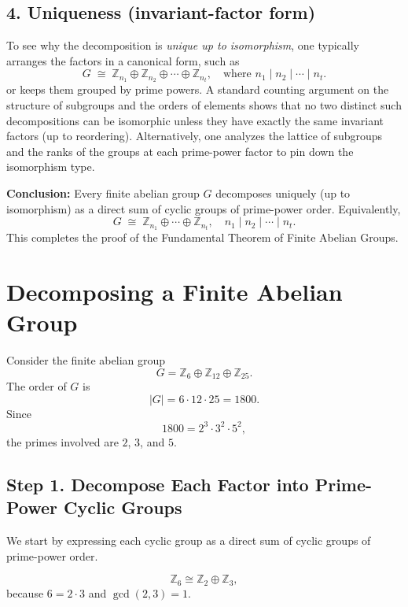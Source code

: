 \documentclass[12pt]{article}
\theoremstyle{definition} %
\theoremstyle{plain} %
\begin{document}
    \subsection*{4. Uniqueness (invariant-factor form)}
    
    To see why the decomposition is \emph{unique up to isomorphism}, one typically arranges the factors in a canonical form, such as
    \[
      G \;\cong\; \mathbb{Z}_{n_1} \oplus \mathbb{Z}_{n_2} \oplus \cdots \oplus \mathbb{Z}_{n_t},
      \quad\text{where } n_1 \mid n_2 \mid \cdots \mid n_t.
    \]
    or keeps them grouped by prime powers.  
    A standard counting argument on the structure of subgroups and the orders of elements shows that no two distinct such decompositions can be isomorphic unless they have exactly the same invariant factors (up to reordering).  
    Alternatively, one analyzes the lattice of subgroups and the ranks of the groups at each prime-power factor to pin down the isomorphism type.
    
    \bigskip
    
    \noindent
    \textbf{Conclusion:}  
    Every finite abelian group $G$ decomposes uniquely (up to isomorphism) as a direct sum of cyclic groups of prime-power order.  
    Equivalently,
    \[
      G \;\cong\; \mathbb{Z}_{n_1} \oplus \cdots \oplus \mathbb{Z}_{n_t},
      \quad n_1 \mid n_2 \mid \cdots \mid n_t.
    \]
    This completes the proof of the Fundamental Theorem of Finite Abelian Groups.
    \section*{Decomposing a Finite Abelian Group}

    Consider the finite abelian group
    \[
    G = \mathbb{Z}_6 \oplus \mathbb{Z}_{12} \oplus \mathbb{Z}_{25}.
    \]
    The order of \(G\) is
    \[
    |G| = 6 \cdot 12 \cdot 25 = 1800.
    \]
    Since
    \[
    1800 = 2^3 \cdot 3^2 \cdot 5^2,
    \]
    the primes involved are \(2\), \(3\), and \(5\).
    
    \subsection*{Step 1. Decompose Each Factor into Prime-Power Cyclic Groups}
    
    We start by expressing each cyclic group as a direct sum of cyclic groups of prime-power order.
    
    \[
    \mathbb{Z}_6 \cong \mathbb{Z}_2 \oplus \mathbb{Z}_3,
    \]
    because \(6 = 2 \cdot 3\) and \(\gcd(2,3)=1\).
    
\end{document}
